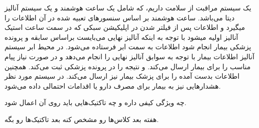 
یک سیستم مراقبت از سلامت داریم، که شامل یک ساعت هوشمند و یک سیستم آنالیز دیتا
می‌باشد. ساعت هوشمند بر اساس سنسور‌های تعبیه شده در آن اطلاعات را میگیرد و
اطلاعات پس از فیلتر شدن در اپلیکیشن سبکی که در سمت ساعت استیک آنالیز اولیه میشود
با توجه به اینکه آنالیز نهایی می‌بایست براساس سابقه و پرونده پزشکی بیمار انجام
شود اطلاعات به سمت ابر فرستاده می‌شود. در محیط ابر سیستم آنالیز اطلاعات بیمار با
توجه به سوابق آنالیز نهایی را انجام می‌دهد و در صورت نیاز پیام مناسب را برای
بیمار ارسال می‌کند. و نتیجه را در پرونده پزشکی ثبت می‌کند. همچنین اطلاعات بدست
آمده را برای پزشک بیمار نیز ارسال می‌کند. در سیستم مورد نظر هشدار‌هایی نیز به
بیمار برای مصرف دارو یا اقدامات احتمالی داده می‌شود.

چه ویژگی کیفی داره و چه تاکتیک‌هایی باید روی آن اعمال شود.

هفته بعد کلاس‌ها رو مشخص کنه بعد تاکتیک‌ها رو بگه.